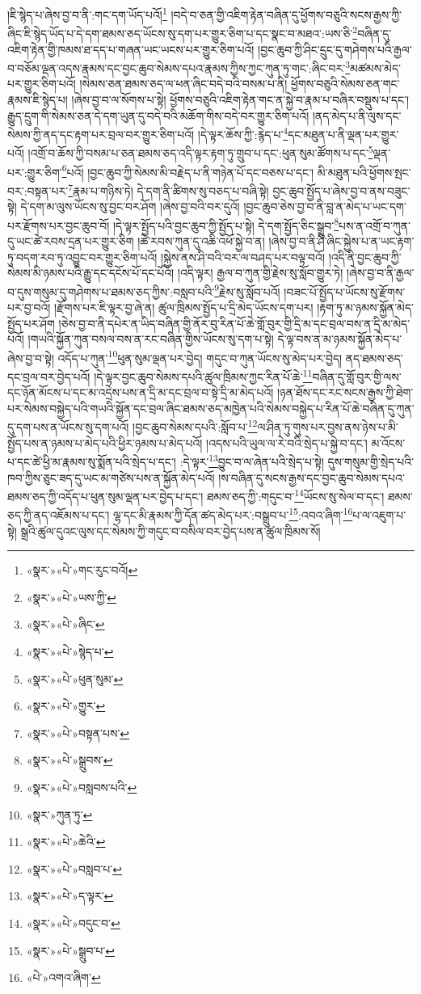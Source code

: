 །ཇི་སྙེད་པ་ཞེས་བྱ་བ་ནི་:གང་དག་ཡོད་པའོ།\footnote{«སྣར་»«པེ་»གང་རུང་བའོ།} །བདེ་བ་ཅན་གྱི་འཇིག་རྟེན་བཞིན་དུ་ཕྱོགས་བཅུའི་སངས་རྒྱས་ཀྱི་ཞིང་ཇི་སྙེད་ཡོད་པ་དེ་དག་ཐམས་ཅད་ཡོངས་སུ་དག་པར་གྱུར་ཅིག་པ་དང་སྣང་བ་མཐའ་:ཡས་ཅི་\footnote{«སྣར་»«པེ་»ཡས་ཀྱི་}བཞིན་དུ་འཇིག་རྟེན་གྱི་ཁམས་ཐ་དད་པ་གཞན་ཡང་ཡངས་པར་གྱུར་ཅིག་པའོ། །བྱང་ཆུབ་ཀྱི་ཤིང་དྲུང་དུ་གཤེགས་པའི་རྒྱལ་བ་བཅོམ་ལྡན་འདས་རྣམས་དང་བྱང་ཆུབ་སེམས་དཔའ་རྣམས་ཀྱིས་ཀྱང་ཀུན་ཏུ་གང་:ཞིང་བར་\footnote{«སྣར་»«པེ་»ཞིང་}མཚམས་མེད་པར་གྱུར་ཅིག་པའོ། །སེམས་ཅན་ཐམས་ཅད་ལ་ཕན་ཞིང་བདེ་བའི་བསམ་པ་ནི། ཕྱོགས་བཅུའི་སེམས་ཅན་གང་རྣམས་ཇི་སྙེད་པ། །ཞེས་བྱ་བ་ལ་སོགས་པ་སྟེ། ཕྱོགས་བཅུའི་འཇིག་རྟེན་གང་ན་སྐྱེ་བ་རྣམ་པ་བཞིར་བསྡུས་པ་དང་། རྒྱུད་དྲུག་གི་སེམས་ཅན་དེ་དག་ཡུན་དུ་བདེ་བའི་མཆོག་གིས་བདེ་བར་གྱུར་ཅིག་པའོ། །ནད་མེད་པ་ནི་ལུས་དང་སེམས་ཀྱི་ནད་དང་རྟག་པར་བྲལ་བར་གྱུར་ཅིག་པའོ། །དེ་ལྟར་ཆོས་ཀྱི་:རྙེད་པ་\footnote{«སྣར་»«པེ་»སྙེད་པ་}དང་མཐུན་པ་ནི་ལྡན་པར་གྱུར་པའོ། །འགྲོ་བ་ཆོས་ཀྱི་བསམ་པ་ཅན་ཐམས་ཅད་འདི་ལྟར་རྟག་ཏུ་གྲུབ་པ་དང་:ཕུན་སུམ་ཚོགས་པ་དང་\footnote{«སྣར་»«པེ་»ཕུན་སུམ་}ལྡན་པར་:གྱུར་ཅིག་\footnote{«སྣར་»«པེ་»གྱུར་}པའོ། །བྱང་ཆུབ་ཀྱི་སེམས་མི་བརྗེད་པ་ནི་གཉེན་པོ་དང་བཅས་པ་དང་། མི་མཐུན་པའི་ཕྱོགས་སྤང་བར་:བསྟན་པར་\footnote{«སྣར་»«པེ་»བསྟན་པས་}རྣམ་པ་གཉིས་ཏེ། དེ་དག་ནི་ཚིགས་སུ་བཅད་པ་བཞི་སྟེ། བྱང་ཆུབ་སྤྱོད་པ་ཞེས་བྱ་བ་ནས་བཟུང་སྟེ། དེ་དག་མ་ལུས་ཡོངས་སུ་བྱང་བར་ཤོག །ཞེས་བྱ་བའི་བར་དུའོ། །བྱང་ཆུབ་ཅེས་བྱ་བ་ནི་བླ་ན་མེད་པ་ཡང་དག་པར་རྫོགས་པར་བྱང་ཆུབ་བོ། །དེ་ལྟར་སྤྱོད་པའི་བྱང་ཆུབ་ཀྱི་སྤྱོད་པ་སྟེ། དེ་དག་སྤྱོད་ཅིང་སྒྲུབ་\footnote{«སྣར་»«པེ་»སྒྲུབས་}པས་ན་འགྲོ་བ་ཀུན་དུ་ཡང་ཚེ་རབས་དྲན་པར་གྱུར་ཅིག །ཚེ་རབས་ཀུན་དུ་འཆི་འཕོ་སྐྱེ་བ་ན། །ཞེས་བྱ་བ་ནི་ཤི་ཞིང་སྐྱེས་པ་ན་ཡང་རྟག་ཏུ་བདག་རབ་ཏུ་འབྱུང་བར་གྱུར་ཅིག་པའོ། །སྐྱེས་ནས་ཤི་བའི་བར་ལ་བཤད་པར་བལྟ་བའོ། །འདི་ནི་བྱང་ཆུབ་ཀྱི་སེམས་མི་ཉམས་པའི་རྒྱུ་དང་དངོས་པོ་དང་པོའོ། །འདི་ལྟར། རྒྱལ་བ་ཀུན་གྱི་རྗེས་སུ་སློབ་གྱུར་ཏེ། །ཞེས་བྱ་བ་ནི་རྒྱལ་བ་དུས་གསུམ་དུ་གཤེགས་པ་ཐམས་ཅད་ཀྱིས་:བསླབ་པའི་\footnote{«སྣར་»«པེ་»བསླབས་པའི་}རྗེས་སུ་སློབ་པའོ། །བཟང་པོ་སྤྱོད་པ་ཡོངས་སུ་རྫོགས་པར་བྱ་བའོ། །རྫོགས་པར་ཇི་ལྟར་བྱ་ཞེ་ན། ཚུལ་ཁྲིམས་སྤྱོད་པ་དྲི་མེད་ཡོངས་དག་པར། །རྟག་ཏུ་མ་ཉམས་སྐྱོན་མེད་སྤྱོད་པར་ཤོག །ཅེས་བྱ་བ་ནི་དཔེར་ན་ཡིད་བཞིན་གྱི་ནོར་བུ་རིན་པོ་ཆེ་གློ་བུར་གྱི་དྲི་མ་དང་བྲལ་བས་ན་དྲི་མ་མེད་པའོ། །གཡའི་སྐྱོན་ཀུན་བསལ་བས་ན་རང་བཞིན་གྱིས་ཡོངས་སུ་དག་པ་སྟེ། དེ་ལྟ་བས་ན་མ་ཉམས་སྐྱོན་མེད་པ་ཞེས་བྱ་བ་སྟེ། འདོད་པ་ཀུན་\footnote{«སྣར་»ཀུན་ཏུ་}ཕུན་སུམ་ལྡན་པར་བྱེད། གདུང་བ་ཀུན་ཡོངས་སུ་མེད་པར་བྱེད། ནད་ཐམས་ཅད་དང་བྲལ་བར་བྱེད་པའོ། །དེ་ལྟར་བྱང་ཆུབ་སེམས་དཔའི་ཚུལ་ཁྲིམས་ཀྱང་རིན་པོ་ཆེ་\footnote{«སྣར་»«པེ་»ཆེའི་}བཞིན་དུ་གློ་བུར་གྱི་ལས་དང་ཉོན་མོངས་པ་དང་མ་འདྲེས་པས་ན་དྲི་མ་དང་བྲལ་བ་སྟེ་དྲི་མ་མེད་པའོ། །ཉན་ཐོས་དང་རང་སངས་རྒྱས་ཀྱི་ཐེག་པར་སེམས་བསྐྱེད་པའི་གཡའི་སྐྱོན་དང་བྲལ་ཞིང་ཐམས་ཅད་མཁྱེན་པའི་སེམས་བསྐྱེད་པ་རིན་པོ་ཆེ་བཞིན་དུ་ཀུན་དུ་དག་པས་ན་ཡོངས་སུ་དག་པའོ། །བྱང་ཆུབ་སེམས་དཔའི་:སློབ་པ་\footnote{«སྣར་»«པེ་»བསླབ་པ་}ལ་ཤིན་ཏུ་གུས་པར་བྱས་ནས་ཉེས་པ་མི་སྤྱོད་པས་ན་ཉམས་པ་མེད་པའི་ཕྱིར་ཉམས་པ་མེད་པའོ། །འདས་པའི་ཡུལ་ལ་རེ་བའི་སྲེད་པ་སྐྱེ་བ་དང་། མ་འོངས་པ་དང་ཚེ་ཕྱི་མ་རྣམས་སུ་སྨོན་པའི་སྲེད་པ་དང་། :དེ་ལྟར་\footnote{«སྣར་»«པེ་»ད་ལྟར་}བྱུང་བ་ལ་ཞེན་པའི་སྲེད་པ་སྟེ། དུས་གསུམ་གྱི་སྲེད་པའི་ཁབ་ཀྱིས་ཅུང་ཟད་དུ་ཡང་མ་གཙེས་པས་ན་སྐྱོན་མེད་པའོ། །ས་བཞིན་དུ་སངས་རྒྱས་དང་བྱང་ཆུབ་སེམས་དཔའ་ཐམས་ཅད་ཀྱི་འདོད་པ་ཕུན་སུམ་ལྡན་པར་བྱེད་པ་དང་། ཐམས་ཅད་ཀྱི་:གདུང་བ་\footnote{«སྣར་»«པེ་»བདུང་བ་}ཡོངས་སུ་སེལ་བ་དང་། ཐམས་ཅད་ཀྱི་ནད་འཇོམས་པ་དང་། ལྷ་དང་མི་རྣམས་ཀྱི་དོན་ཚད་མེད་པར་:བསྒྲུབ་པ་\footnote{«སྣར་»«པེ་»སྒྲུབ་པ་}:འབའ་ཞིག་\footnote{«པེ་»འགའ་ཞིག་}པ་ལ་འཇུག་པ་སྟེ། སྒྲའི་ཚུལ་དུའང་ལུས་དང་སེམས་ཀྱི་གདུང་བ་བསིལ་བར་བྱེད་པས་ན་ཚུལ་ཁྲིམས་སོ། 